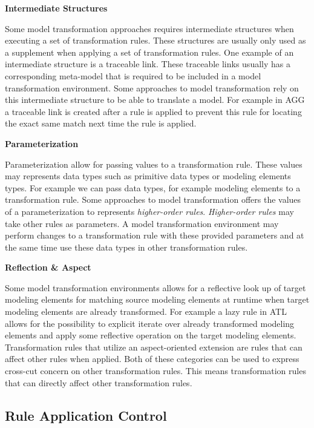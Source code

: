 \textbf{Intermediate Structures}

Some model transformation approaches requires intermediate structures when
executing a set of transformation rules. These structures are usually only
used as a supplement when applying a set of transformation rules. One
example of an intermediate structure is a traceable link. These traceable links
usually has a corresponding meta-model that is required to be included in a
model transformation environment. Some approaches to model transformation rely
on this intermediate structure to be able to translate a model. For example in
AGG a traceable link is created after a rule is applied to prevent this rule for
locating the exact same match next time the rule is applied.

\textbf{Parameterization}

Parameterization allow for passing values to a transformation rule. These
values may represents data types such as primitive data types or modeling elements
types. For example we can pass data types, for example modeling elements to a
transformation rule. Some approaches to model transformation offers the values
of a parameterization to represents \textit{higher-order rules}. 
\textit{Higher-order rules} may take other rules as parameters. A model
transformation environment may perform changes to a transformation rule with
these provided parameters and at the same time use these data types in other
transformation rules.

\textbf{Reflection \& Aspect}

Some model transformation environments allows for a reflective look up of target
modeling elements for matching source modeling elements at runtime when target
modeling elements are already transformed. For example a lazy rule in ATL allows for
the possibility to explicit iterate over already transformed modeling elements
and apply some reflective operation on the target modeling elements. Transformation rules that
utilize an aspect-oriented extension are rules that can affect other rules when
applied. Both of these categories can be used to express cross-cut concern
on other transformation rules. This means transformation rules that can directly
affect other transformation rules. 

\subsection{Rule Application Control}
\label{sec:app_control}

